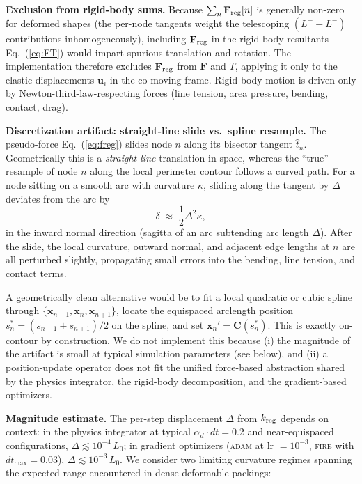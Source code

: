 \documentclass[aps,pre,twocolumn,floatfix,longbibliography]{revtex4-2}
\begin{document}
\textbf{Exclusion from rigid-body sums.}
Because $\sum_n \mathbf{F}_{\rm reg}[n]$ is generally non-zero for deformed
shapes (the per-node tangents weight the telescoping
$(L^+ - L^-)$ contributions inhomogeneously), including
$\mathbf{F}_{\rm reg}$ in the rigid-body resultants
Eq.~(\ref{eq:FT}) would impart spurious translation and rotation. The
implementation therefore excludes $\mathbf{F}_{\rm reg}$ from
$\mathbf{F}$ and $T$, applying it only to the elastic displacements
$\mathbf{u}_i$ in the co-moving frame. Rigid-body motion is driven only
by Newton-third-law-respecting forces (line tension, area pressure,
bending, contact, drag).

\textbf{Discretization artifact: straight-line slide vs.\ spline resample.}
The pseudo-force Eq.~(\ref{eq:freg}) slides node $n$ along its bisector
tangent $\hat{t}_n$. Geometrically this is a \emph{straight-line} translation
in space, whereas the ``true'' resample of node $n$ along the local
perimeter contour follows a curved path. For a node sitting on a smooth
arc with curvature $\kappa$, sliding along the tangent by $\Delta$
deviates from the arc by
\begin{equation}
  \delta \;\approx\; \frac{1}{2}\Delta^2 \kappa,
\label{eq:slide_error}
\end{equation}
in the inward normal direction (sagitta of an arc subtending arc length
$\Delta$). After the slide, the local curvature, outward normal, and
adjacent edge lengths at $n$ are all perturbed slightly, propagating
small errors into the bending, line tension, and contact terms.

A geometrically clean alternative would be to fit a local quadratic
or cubic spline through $\{\mathbf{x}_{n-1}, \mathbf{x}_n, \mathbf{x}_{n+1}\}$,
locate the equispaced arclength position $s_n^* = (s_{n-1}+s_{n+1})/2$
on the spline, and set $\mathbf{x}_n' = \mathbf{C}(s_n^*)$. This is
exactly on-contour by construction. We do not implement this because
(i) the magnitude of the artifact is small at typical simulation
parameters (see below), and (ii) a position-update operator does not
fit the unified force-based abstraction shared by the physics integrator,
the rigid-body decomposition, and the gradient-based optimizers.

\textbf{Magnitude estimate.}
The per-step displacement $\Delta$ from $k_{\rm reg}$ depends on context:
in the physics integrator at typical $\alpha_d \cdot dt = 0.2$ and
near-equispaced configurations, $\Delta \lesssim 10^{-4}\,L_0$; in
gradient optimizers (\textsc{adam} at lr $= 10^{-3}$, \textsc{fire}
with $dt_{\max} = 0.03$), $\Delta \lesssim 10^{-3}\,L_0$. We consider
two limiting curvature regimes spanning the expected range
encountered in dense deformable packings:
\end{document}
